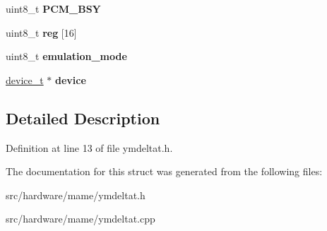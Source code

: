 \begin{DoxyCompactItemize}
\item 
\hypertarget{structYM__DELTAT_af36b18fde064586b42e8af6d04a06029}{uint8\-\_\-t {\bfseries P\-C\-M\-\_\-\-B\-S\-Y}}\label{structYM__DELTAT_af36b18fde064586b42e8af6d04a06029}

\item 
\hypertarget{structYM__DELTAT_ab06202098c67173da9a65c674c41dd7d}{uint8\-\_\-t {\bfseries reg} \mbox{[}16\mbox{]}}\label{structYM__DELTAT_ab06202098c67173da9a65c674c41dd7d}

\item 
\hypertarget{structYM__DELTAT_ae83d8cc22dda851d8f1297dcc9251cfb}{uint8\-\_\-t {\bfseries emulation\-\_\-mode}}\label{structYM__DELTAT_ae83d8cc22dda851d8f1297dcc9251cfb}

\item 
\hypertarget{structYM__DELTAT_a7ff3083a2d919a3787e7a29d57e55d38}{\hyperlink{classdevice__t}{device\-\_\-t} $\ast$ {\bfseries device}}\label{structYM__DELTAT_a7ff3083a2d919a3787e7a29d57e55d38}

\end{DoxyCompactItemize}


\subsection{Detailed Description}


Definition at line 13 of file ymdeltat.\-h.



The documentation for this struct was generated from the following files\-:\begin{DoxyCompactItemize}
\item 
src/hardware/mame/ymdeltat.\-h\item 
src/hardware/mame/ymdeltat.\-cpp\end{DoxyCompactItemize}
